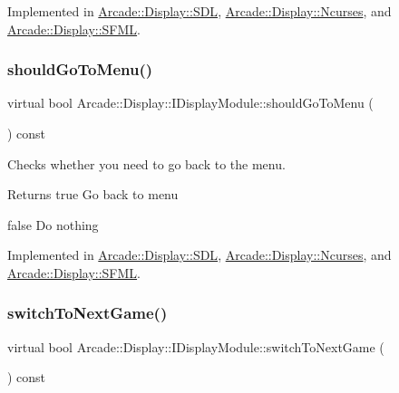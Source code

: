 Implemented in \mbox{\hyperlink{classArcade_1_1Display_1_1SDL_adb5d8837174b0ca120a27a521320f9c0}{Arcade\+::\+Display\+::\+S\+DL}}, \mbox{\hyperlink{classArcade_1_1Display_1_1Ncurses_a6d27fa12cb2086a3ded2f40462c5ddab}{Arcade\+::\+Display\+::\+Ncurses}}, and \mbox{\hyperlink{classArcade_1_1Display_1_1SFML_a780a71713551c8dffd1f008802f96767}{Arcade\+::\+Display\+::\+S\+F\+ML}}.

\mbox{\label{classArcade_1_1Display_1_1IDisplayModule_ad060f6b99f2adffaf02a4226fc40d0ab}} 
\subsubsection{\texorpdfstring{shouldGoToMenu()}{shouldGoToMenu()}}
{\footnotesize\ttfamily virtual bool Arcade\+::\+Display\+::\+I\+Display\+Module\+::should\+Go\+To\+Menu (\begin{DoxyParamCaption}{ }\end{DoxyParamCaption}) const\hspace{0.3cm}{\ttfamily [pure virtual]}}



Checks whether you need to go back to the menu. 

\begin{DoxyReturn}{Returns}
true Go back to menu 

false Do nothing 
\end{DoxyReturn}


Implemented in \mbox{\hyperlink{classArcade_1_1Display_1_1SDL_a044e009d7fc03813fce09abed3a6694c}{Arcade\+::\+Display\+::\+S\+DL}}, \mbox{\hyperlink{classArcade_1_1Display_1_1Ncurses_a807e935000fce3f6f405cb6aa6239246}{Arcade\+::\+Display\+::\+Ncurses}}, and \mbox{\hyperlink{classArcade_1_1Display_1_1SFML_a3072fbe4dd92685154da10cbd602bc3b}{Arcade\+::\+Display\+::\+S\+F\+ML}}.

\mbox{\label{classArcade_1_1Display_1_1IDisplayModule_a9584cb0ca3b157c9a4ec94509e4f8e32}} 
\subsubsection{\texorpdfstring{switchToNextGame()}{switchToNextGame()}}
{\footnotesize\ttfamily virtual bool Arcade\+::\+Display\+::\+I\+Display\+Module\+::switch\+To\+Next\+Game (\begin{DoxyParamCaption}{ }\end{DoxyParamCaption}) const\hspace{0.3cm}{\ttfamily [pure virtual]}}



